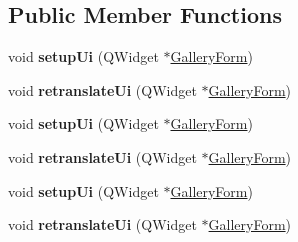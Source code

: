 \subsection*{Public Member Functions}
\begin{DoxyCompactItemize}
\item 
void {\bfseries setup\+Ui} (Q\+Widget $\ast$\hyperlink{class_gallery_form}{Gallery\+Form})\hypertarget{class_ui___gallery_form_a8d1cad42443267f9c604ed6df2a6ba83}{}\label{class_ui___gallery_form_a8d1cad42443267f9c604ed6df2a6ba83}

\item 
void {\bfseries retranslate\+Ui} (Q\+Widget $\ast$\hyperlink{class_gallery_form}{Gallery\+Form})\hypertarget{class_ui___gallery_form_ad46d3ed821ae893905232ca00cf1adce}{}\label{class_ui___gallery_form_ad46d3ed821ae893905232ca00cf1adce}

\item 
void {\bfseries setup\+Ui} (Q\+Widget $\ast$\hyperlink{class_gallery_form}{Gallery\+Form})\hypertarget{class_ui___gallery_form_a8d1cad42443267f9c604ed6df2a6ba83}{}\label{class_ui___gallery_form_a8d1cad42443267f9c604ed6df2a6ba83}

\item 
void {\bfseries retranslate\+Ui} (Q\+Widget $\ast$\hyperlink{class_gallery_form}{Gallery\+Form})\hypertarget{class_ui___gallery_form_ad46d3ed821ae893905232ca00cf1adce}{}\label{class_ui___gallery_form_ad46d3ed821ae893905232ca00cf1adce}

\item 
void {\bfseries setup\+Ui} (Q\+Widget $\ast$\hyperlink{class_gallery_form}{Gallery\+Form})\hypertarget{class_ui___gallery_form_a8d1cad42443267f9c604ed6df2a6ba83}{}\label{class_ui___gallery_form_a8d1cad42443267f9c604ed6df2a6ba83}

\item 
void {\bfseries retranslate\+Ui} (Q\+Widget $\ast$\hyperlink{class_gallery_form}{Gallery\+Form})\hypertarget{class_ui___gallery_form_ad46d3ed821ae893905232ca00cf1adce}{}\label{class_ui___gallery_form_ad46d3ed821ae893905232ca00cf1adce}

\end{DoxyCompactItemize}
